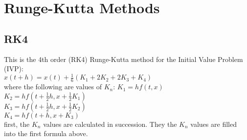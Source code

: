 \section{Runge-Kutta Methods}
\subsection*{RK4}
This is the 4th order (RK4) Runge-Kutta
method for the Initial Value Problem (IVP):\\
$x(t+h) = x(t) + \frac{1}{6}( K_1  + 2K_2 + 2K_3 + K_4) $\\
where the following are values of $K_n$:
$ K_1 = h f(t,x)    $\\
$ K_2 = h f(t + \frac{1}{2} h , x + \frac{1}{2} K_1)    $\\
$ K_3 = h f(t + \frac{1}{2} h , x + \frac{1}{2} K_2)    $\\
$ K_4 = h f(t + h ,x + K_3)    $\\
first, the $K_n$ values are calculated in succession. They the $K_n$
values are filled into the first formula above.
